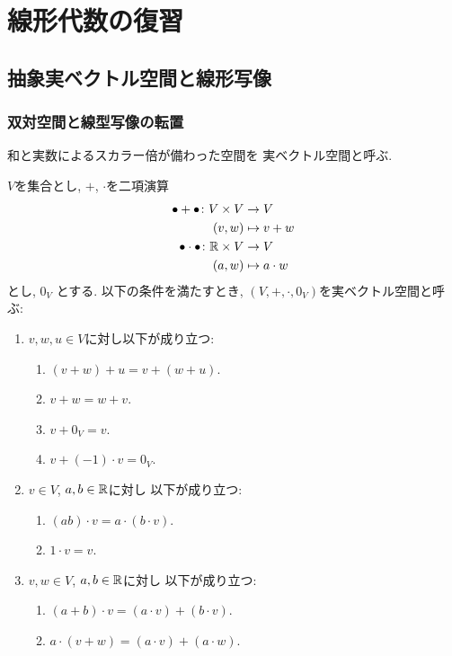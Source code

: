
\chapter{線形代数の復習}

\section{抽象実ベクトル空間と線形写像}
\subsection{双対空間と線型写像の転置}
和と実数によるスカラー倍が備わった空間を
実ベクトル空間と呼ぶ.
\begin{definition}
  $V$を集合とし,
  $+$, $\cdot$を二項演算
  \begin{align*}
    \bullet + \bullet \colon V\times V &\to V\\
    (v,w)&\mapsto v+w\\
    \bullet \cdot \bullet \colon \mathbb{R}\times V &\to V\\
    (a,w)&\mapsto a\cdot w
  \end{align*}
  とし,
  $0_V$
  とする.
  以下の条件を満たすとき,
  $(V,+,\cdot,0_V)$を実ベクトル空間と呼ぶ:
  \begin{enumerate}
  \item $v,w,u\in V$に対し以下が成り立つ:
    \begin{enumerate}
    \item $(v+w)+u=v+(w+u)$.
    \item $v+w=w+v$.
    \item $v+0_V=v$.
    \item $v+(-1)\cdot v=0_V$.
    \end{enumerate}
  \item $v\in V$, $a,b\in\mathbb{R}$に対し
    以下が成り立つ:
    \begin{enumerate}
    \item $(ab)\cdot v=a\cdot (b\cdot v)$.
    \item $1\cdot v=v$.
    \end{enumerate}      
  \item $v,w \in V$, $a,b\in\mathbb{R}$に対し
    以下が成り立つ:
    \begin{enumerate}
    \item $(a+b)\cdot v=(a\cdot v) + (b\cdot v)$.
    \item $a\cdot (v+w)=(a\cdot v) + (a\cdot w)$.
    \end{enumerate}      
  \end{enumerate}
\end{definition}
